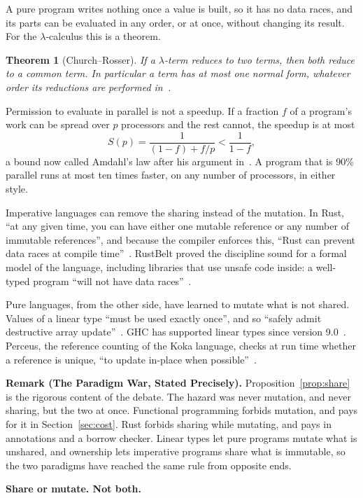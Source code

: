 \documentclass[11pt]{article}
\newtheorem{theorem}{Theorem}[section]
\theoremstyle{definition}
\theoremstyle{remark}
\begin{document}
A pure program writes nothing once a value is built, so it has no data
races, and its parts can be evaluated in any order, or at once, without
changing its result. For the $\lambda$-calculus this is a theorem.

\begin{theorem}[Church--Rosser]\label{thm:cr}
  If a $\lambda$-term reduces to two terms, then both reduce to a common
  term. In particular a term has at most one normal form, whatever order
  its reductions are performed in~\cite{churchrosser}.
\end{theorem}

Permission to evaluate in parallel is not a speedup. If a fraction $f$ of
a program's work can be spread over $p$ processors and the rest cannot,
the speedup is at most
\begin{equation}
  S(p) = \frac{1}{(1-f) + f/p} < \frac{1}{1-f},
\end{equation}
a bound now called Amdahl's law after his argument in~\cite{amdahl}. A
program that is 90\% parallel runs at most ten times faster, on any
number of processors, in either style.

Imperative languages can remove the sharing instead of the mutation. In
Rust, ``at any given time, you can have either one mutable reference or
any number of immutable references'', and because the compiler enforces
this, ``Rust can prevent data races at compile time''~\cite{rustbook}.
RustBelt proved the discipline sound for a formal model of the language,
including libraries that use unsafe code inside: a well-typed program
``will not have data races''~\cite{rustbelt}.

Pure languages, from the other side, have learned to mutate what is not
shared. Values of a linear type ``must be used exactly once'', and so
``safely admit destructive array update''~\cite{wadler90}. GHC has
supported linear types since version 9.0~\cite{linearhaskell,ghc9}.
Perceus, the reference counting of the Koka language, checks at run time
whether a reference is unique, ``to update in-place when
possible''~\cite{perceus}.

\begin{tcolorbox}[colback=white, colframe=black!50, boxrule=0.5pt]
  \textbf{Remark (The Paradigm War, Stated Precisely).}
  Proposition~\ref{prop:share} is the rigorous content of the debate. The
  hazard was never mutation, and never sharing, but the two at once.
  Functional programming forbids mutation, and pays for it in
  Section~\ref{sec:cost}. Rust forbids sharing while mutating, and pays
  in annotations and a borrow checker. Linear types let pure programs
  mutate what is unshared, and ownership lets imperative programs share
  what is immutable, so the two paradigms have reached the same rule from
  opposite ends.

  \begin{center}
    \bfseries Share or mutate. Not both.
  \end{center}
\end{tcolorbox}
\end{document}
